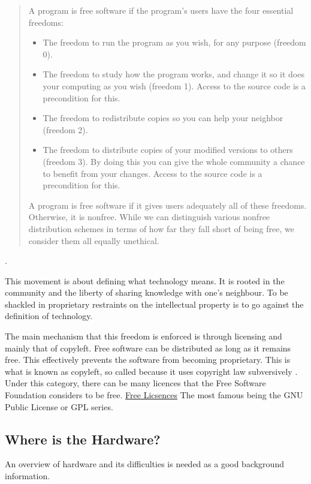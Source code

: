 \documentclass{article}
\begin{document}
\begin{quote}
    A program is free software if the program’s users have the four essential freedoms:

    \begin{itemize}
        \item The freedom to run the program as you wish, for any purpose (freedom 0).
        \item The freedom to study how the program works, and change it so it does your computing as you wish (freedom 1). 
            Access to the source code is a precondition for this.
        \item The freedom to redistribute copies so you can help your neighbor (freedom 2).
        \item The freedom to distribute copies of your modified versions to others (freedom 3). 
            By doing this you can give the whole community a chance to benefit from your changes. Access to the source code is a precondition for this.
    \end{itemize}
    A program is free software if it gives users adequately all of these freedoms. Otherwise, it is nonfree. 
    While we can distinguish various nonfree distribution schemes in terms of how far they fall short of being free, we consider them all equally unethical.
\end{quote} \cite{b0_stallman}.

This movement is about defining what technology means. 
It is rooted in the community and the liberty of sharing knowledge with one's neighbour. 
To be shackled in proprietary restraints on the intellectual property is to go against the definition of technology.

The main mechanism that this freedom is enforced is through licensing and mainly that of copyleft. 
Free software can be distributed as long as it remains free. 
This effectively prevents the software from becoming proprietary. 
This is what is known as copyleft, so called because it uses copyright law subversively \cite{b0_stallman}.
Under this category, there can be many licences that the Free Software Foundation considers to be free.
\href{https://www.gnu.org/licenses/license-list.html}{Free Licsences}
The most famous being the GNU Public License or GPL series.

\subsection{Where is the Hardware?}
An overview of hardware and its difficulties is needed as a good background information. 
\end{document}
